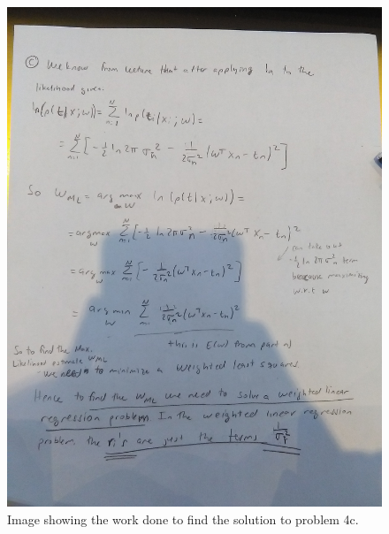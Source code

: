 \documentclass[12pt]{article}
\begin{document}
\begin{figure}[!htbp]
\centering
\includegraphics[width=15cm]{Problem_4c.jpg}
\caption{Image showing the work done to find the solution to problem 4c.}
\end{figure}
\end{document}

